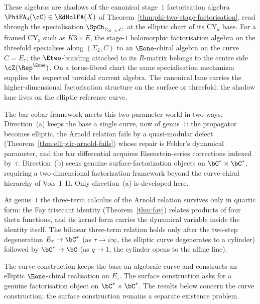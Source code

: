 These algebras are shadows of the canonical stage~$1$ factorisation algebra $\PhiFA_d(\cC) \in \EdHolFA(X)$ of Theorem~\ref{thm:phi-two-stage-factorisation}, read through the specialisation $\SpCh_{\Sigma_{d-1}, C}$ at the elliptic chart of its CY$_d$ base. For a framed CY$_3$ such as $K3 \times E$, the stage-$1$ holomorphic factorisation algebra on the threefold specialises along $(\Sigma_2,C)$ to an $\Eone$-chiral algebra on the curve $C = E_\tau$; the $\Etwo$-braiding attached to its $R$-matrix belongs to the centre side $\cZ(\Rep^{\Eone})$. On a torus-fibred chart the same specialisation mechanism supplies the expected toroidal current algebra. The canonical lane carries the higher-dimensional factorisation structure on the surface or threefold; the shadow lane lives on the elliptic reference curve.

The bar-cobar framework meets this two-parameter world in two ways.
Direction~(a) keeps the base a single curve, now of genus~$1$: the
propagator becomes elliptic, the Arnold relation fails by a
quasi-modular defect (Theorem~\ref{thm:elliptic-arnold-fails}) whose
repair is Felder's dynamical parameter, and the bar differential
acquires Eisenstein-series corrections indexed by~$\tau$. Direction~(b)
seeks genuine surface-factorization objects on $\bC^* \times \bC^*$,
requiring a two-dimensional factorization framework beyond the
curve-chiral hierarchy of Vols~I--II. Only direction~(a) is developed
here.

At genus~$1$ the three-term calculus of the Arnold relation survives
only in quartic form: the Fay trisecant identity
(Theorem~\ref{thm:fay}) relates products of four theta functions, and
its kernel form carries the dynamical variable inside the identity
itself. The bilinear three-term relation holds only after the
two-step degeneration $E_\tau \to \bC^*$ (as $\tau \to i\infty$,
the elliptic curve degenerates to a cylinder) followed by
$\bC^* \to \bC$ (as $q \to 1$, the cylinder opens to the affine line).

\begin{remark}
\label{rem:toroidal-two-tracks}
The curve construction keeps the base an algebraic curve and constructs
an elliptic $\Eone$-chiral realisation on $E_\tau$. The surface
construction asks for a genuine factorisation object on
$\bC^*\times\bC^*$. The results below concern the curve construction;
the surface construction remains a separate existence problem.
\end{remark}

